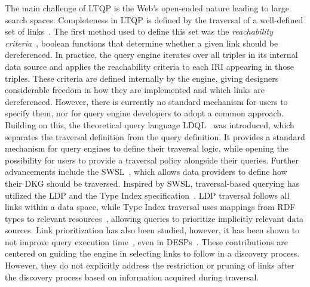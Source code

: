 The main challenge of \ac{LTQP} is the Web's open-ended nature leading to large search spaces.
Completeness in \ac{LTQP} is defined by the traversal of a well-defined set of links~\cite{Hartig2012}.
The first method used to define this set was the \emph{reachability criteria}~\cite{Hartig2012}, boolean functions that determine whether a given link should be dereferenced.
In practice, the query engine iterates over all triples in its internal data source and applies the reachability criteria to each \ac{IRI} appearing in those triples.
These criteria are defined internally by the engine, giving designers considerable freedom in how they are implemented and which links are dereferenced. 
However, there is currently no standard mechanism for users to specify them, nor for query engine developers to adopt a common approach.
Building on this, the theoretical query language \ac{LDQL}~\cite{hartigLDQL} was introduced, which separates the traversal definition from the query definition.
It provides a standard mechanism for query engines to define their traversal logic, while opening the possibility for users to provide a traversal policy alongside their queries.
Further advancements include the \ac{SWSL}~\cite{Bogaerts2021LinkTW}, which allows data providers to define how their \ac{DKG} should be traversed.
Inspired by \ac{SWSL}, traversal-based querying has utilized the \ac{LDP} and the Type Index specification~\cite{Taelman2023}.
\ac{LDP} traversal follows all links within a data space, while Type Index traversal uses mappings from \ac{RDF} types to relevant resources~\cite{solidTypeIndexes}, allowing queries to prioritize implicitly relevant data sources.
Link prioritization has also been studied, however, it has been shown to not improve query execution time~\cite{hartig2016walking}, even in \acp{DESP}~\cite{eschauzier_iswc_research_linkprioritization_2025}.
These contributions are centered on guiding the engine in selecting links to follow in a discovery process.
However, they do not explicitly address the restriction or pruning of links after the discovery process based on information acquired during traversal.
